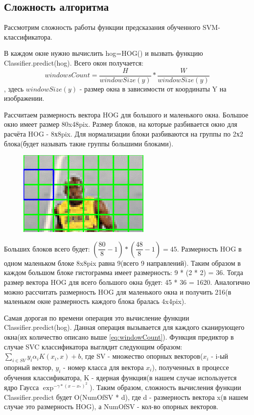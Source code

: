 \subsection{Сложность алгоритма}
Рассмотрим сложность работы функции предсказания обученного SVM-классификатора.

В каждом окне нужно вычислить hog=HOG() и вызвать функцию Classifier.predict(hog). Всего окон получается: 
\begin{equation}
windowsCount = \dfrac{H}{windowSize(y)} * \dfrac{W}{windowSize(y)}
\label{eq:windowCount}
\end{equation}, здесь $windowSize(y)$ - размер окна в зависимости от координаты Y на изображении.

Рассчитаем размерность вектора HOG для большого и маленького окна. Большое окно имеет размер 80x48pix. Размер блоков, на которые разбивается окно для расчёта HOG - 8х8pix. Для нормализации блоки разбиваются на группы по 2х2 блока(будет называть такие группы большими блоками).
\begin{figure}[h!]
	\centering
	\includegraphics[width=0.7\linewidth]{pictures/screenshot02332}
	\caption{}
	\label{fig:screenshot02332}
\end{figure}

Больших блоков всего будет: $(\dfrac{80}{8} - 1)* (\dfrac{48}{8} - 1) = 45$. Размерность HOG в одном маленьком блоке 8x8pix равна 9(всего 9 направлений). Таким образом в каждом большом блоке гистограмма имеет размерность: 9 * (2 * 2) = 36. Тогда размер вектора HOG для всего большого окна будет: 45 * 36 = 1620. Аналогично можно рассчитать размерность HOG для маленького окна и получить 216(в маленьком окне размерность каждого блока бралась 4x4pix).

Самая дорогая по времени операция это вычисление функции Classifier.predict(hog). Данная операция вызывается для каждого сканирующего окна(их количество описано выше \ref{eq:windowCount}). Функция предиктор в случае SVC классификатора выглядит следующим образом: $\sum_{i \in SV} y_i\alpha_i K(x_i, x) + b$, где SV - множество опорных векторов($x_i$ - i-ый опорный вектор, $y_i$ - номер класса для вектора $x_i$), полученных в процессе обучения классификатора, K - ядерная функция(в нашем случае используется ядро Гаусса $\exp^{-\gamma*(x-x_*)^2}$). Таким образом, сложность вычисления функции Classifier.predict будет O(NumOfSV * d), где d - размерность вектора x(в нашем случае это размерность HOG), а NumOfSV - кол-во опорных векторов. 

